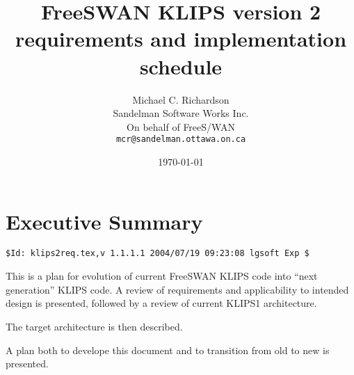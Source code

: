 \documentclass[titlepage]{article}
\author{Michael C. Richardson\\
	Sandelman Software Works Inc.\\
	On behalf of FreeS/WAN\\
	{\tt mcr@sandelman.ottawa.on.ca}}
\date{\today}
\title{FreeSWAN KLIPS version 2 requirements and implementation schedule}
\begin{document}
\maketitle\newpage

\section{Executive Summary}

\begin{verbatim}
$Id: klips2req.tex,v 1.1.1.1 2004/07/19 09:23:08 lgsoft Exp $
\end{verbatim}

This is a plan for evolution of current FreeSWAN KLIPS code into ``next
generation'' KLIPS code. A review of requirements and applicability to
intended design is presented, followed by a review of current KLIPS1
architecture.

The target architecture is then described.

A plan both to develope this document and to transition from old to new is
presented.









\end{document}
